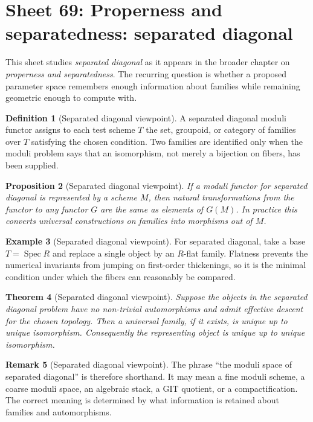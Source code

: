 \documentclass[11pt]{amsart}
\newtheorem{theorem}{Theorem}[section]
\newtheorem{proposition}[theorem]{Proposition}
\theoremstyle{definition}
\newtheorem{definition}[theorem]{Definition}
\newtheorem{example}[theorem]{Example}
\newtheorem{remark}[theorem]{Remark}
\newcommand{\Spec}{\operatorname{Spec}}
\begin{document}
\section{Sheet 69: Properness and separatedness: separated diagonal}
This sheet studies \emph{separated diagonal} as it appears in the broader chapter on \emph{properness and separatedness}.  The recurring question is whether a proposed parameter space remembers enough information about families while remaining geometric enough to compute with.
\begin{definition}[Separated diagonal viewpoint]
A separated diagonal moduli functor assigns to each test scheme $T$ the set, groupoid, or category of families over $T$ satisfying the chosen condition.  Two families are identified only when the moduli problem says that an isomorphism, not merely a bijection on fibers, has been supplied.
\end{definition}
\begin{proposition}[Separated diagonal viewpoint]
If a moduli functor for separated diagonal is represented by a scheme $M$, then natural transformations from the functor to any functor $G$ are the same as elements of $G(M)$.  In practice this converts universal constructions on families into morphisms out of $M$.
\end{proposition}
\begin{example}[Separated diagonal viewpoint]
For separated diagonal, take a base $T=\Spec R$ and replace a single object by an $R$-flat family.  Flatness prevents the numerical invariants from jumping on first-order thickenings, so it is the minimal condition under which the fibers can reasonably be compared.
\end{example}
\begin{theorem}[Separated diagonal viewpoint]
Suppose the objects in the separated diagonal problem have no non-trivial automorphisms and admit effective descent for the chosen topology.  Then a universal family, if it exists, is unique up to unique isomorphism.  Consequently the representing object is unique up to unique isomorphism.
\end{theorem}
\begin{remark}[Separated diagonal viewpoint]
The phrase ``the moduli space of separated diagonal'' is therefore shorthand.  It may mean a fine moduli scheme, a coarse moduli space, an algebraic stack, a GIT quotient, or a compactification.  The correct meaning is determined by what information is retained about families and automorphisms.
\end{remark}
\end{document}
